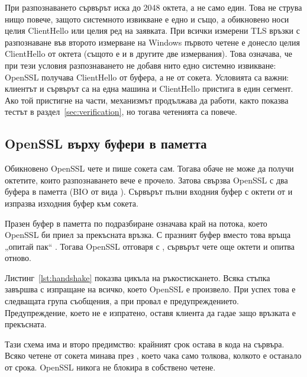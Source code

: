 

При разпознаването сървърът иска до 2048 октета, а не само един. Това не струва нищо
повече, защото системното извикване е едно и също, а обикновено носи целия ClientHello
или целия ред на заявката. При всички \winTotal{} измерени TLS връзки с разпознаване във
второто измерване на Windows първото четене е донесло целия ClientHello от
\winFirstReadMedian{} октета (същото е и в другите две измервания). Това означава, че
при тези условия разпознаването не добавя нито едно системно извикване: OpenSSL получава
ClientHello от буфера, а не от сокета. Условията са важни: клиентът и сървърът са на
една машина и ClientHello пристига в един сегмент. Ако той пристигне на части,
механизмът продължава да работи, както показва тестът в раздел~\ref{sec:verification},
но тогава четенията са повече.

\subsection{OpenSSL върху буфери в паметта}

Обикновено OpenSSL чете и пише сокета сам. Тогава обаче не може да получи октетите,
които разпознаването вече е прочело. Затова  свързва OpenSSL с два буфера в
паметта (BIO от вида  \cite{openssl_biomem}). Сървърът пълни входния
буфер с октети от  и изпразва изходния буфер към сокета.

Празен буфер в паметта по подразбиране означава край на потока, което OpenSSL би приел
за прекъсната връзка. С  празният буфер
вместо това връща „опитай пак“ \cite{openssl_biomem}. Тогава OpenSSL отговаря с
, сървърът чете още октети и опитва отново.

Листинг~\ref{lst:handshake} показва цикъла на ръкостискането. Всяка стъпка завършва с
изпращане на всичко, което OpenSSL е произвело. При успех това е следващата група
съобщения, а при провал е предупреждението. Предупреждение, което не е изпратено,
оставя клиента да гадае защо връзката е прекъсната.



Тази схема има и второ предимство: крайният срок остава в кода на сървъра. Всяко четене
от сокета минава през , което чака само толкова, колкото е останало от
срока. OpenSSL никога не блокира в собствено четене.

